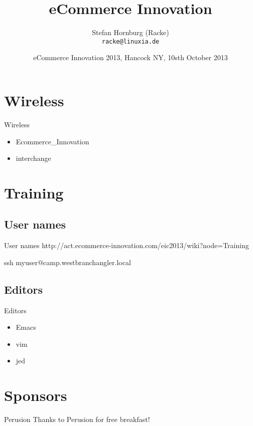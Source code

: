 \usepackage[utf8]{inputenc}
\usepackage[T1]{fontenc}
\usepackage{mathptmx}
\usepackage[scaled=.90]{helvet}
\usepackage{courier}
\usepackage{caption}
\captionsetup{labelformat=empty,labelsep=none}
\usepackage{beamerthemesplit}
\usepackage{verbatim}
\usepackage{hyperref}
\usepackage{listings}
\lstset{language=Perl,basicstyle=\normalsize,tabsize=3,showstringspaces=false}

\title{eCommerce Innovation}
\author[racke]{Stefan Hornburg (Racke)\\ \texttt{racke@linuxia.de}}
\date{eCommerce Innovation 2013, Hancock NY, 10sth October 2013}


\maketitle{}

\begin{frame}
  \titlepage
\end{frame}

\tableofcontents

\section{Wireless}

\begin{frame}[fragile]{Wireless}
\begin{itemize}
\item Ecommerce\_Innovation
\item interchange
\end{itemize}
\end{frame}

\section{Training}

\subsection{User names}
\begin{frame}[fragile]{User names}
http://act.ecommerce-innovation.com/eic2013/wiki?node=Training

ssh myuser@camp.westbranchangler.local
\end{frame}

\subsection{Editors}
\begin{frame}{Editors}
\begin{itemize}
\item Emacs
\item vim
\item jed
\end{itemize}
\end{frame}

\section{Sponsors}
\begin{frame}{Perusion}
Thanks to Perusion for free breakfast!
\end{frame}



